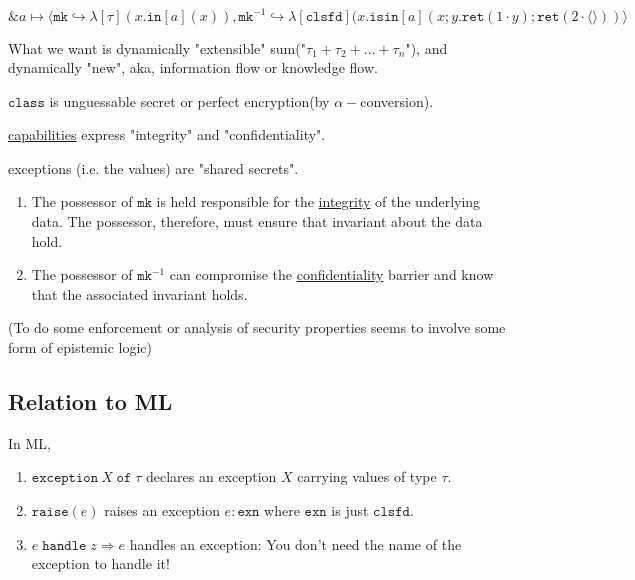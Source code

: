 \documentclass[11pt]{article}
\newcommand{\T}[1]{\ensuremath{\mathtt{#1}}}
\newcommand{\Lunit}{\ensuremath{\langle\rangle}}
\begin{document}
$$\& a \mapsto\langle \T{mk}\hookrightarrow \lambda[\tau](x.\T{in}[a](x)),
\T{mk}^{-1}\hookrightarrow
\lambda[\T{clsfd}](x.\T{isin}[a](x;y.\T{ret}(1\cdot y);
\T{ret}(2\cdot\Lunit))\rangle$$

What we want is dynamically "extensible" sum("$\tau_1 + \tau_2 + ... + \tau_n$"), and dynamically "new", aka, information flow or knowledge flow.

$\texttt{class}$ is unguessable secret or perfect encryption(by $\alpha-$conversion).

\underline{capabilities} express "integrity" and "confidentiality".

exceptions (i.e. the values) are "shared secrets".

\begin{enumerate}
\item The possessor of $\T{mk}$ is held responsible for the
\underline{integrity} of the underlying data.  The possessor, therefore, must ensure that invariant about the data hold.
\item The possessor of $\T{mk}^{-1}$ can compromise the \underline{confidentiality} barrier and know that the associated invariant holds.
\end{enumerate}


(To do some enforcement or analysis of security properties seems to involve
some form of epistemic logic)

\vspace{1em}

\subsection{Relation to ML}

In ML,
\begin{enumerate}
\item $\T{exception}\ X \;\T{of}\; \tau$ declares an exception $X$ carrying
values of type $\tau$.
\item $\T{raise}(e)$ raises an exception $e : \T{exn}$ where $\T{exn}$ is just
$\T{clsfd}$.
\item $e\;\T{handle}\; z\Rightarrow e$ handles an exception: You don't
need the name of the exception to handle it!
\end{enumerate}
\end{document}
